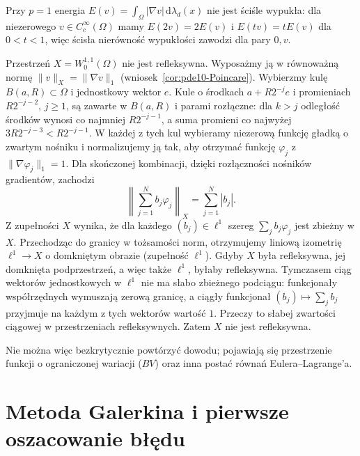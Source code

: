 \begin{uwaga}[Dlaczego pominięto przypadek $p=1$?]
Przy $p=1$ energia
$E(v)=\int_\Omega|\nabla v|\,\mathrm d\lambda_d(x)$
nie jest ściśle wypukła: dla niezerowego
$v\in C_c^\infty(\Omega)$ mamy $E(2v)=2E(v)$
i $E(tv)=tE(v)$ dla $0<t<1$, więc ścisła
nierówność wypukłości zawodzi dla pary $0,v$.

Przestrzeń $X=W_0^{1,1}(\Omega)$ nie jest refleksywna.
Wyposażmy ją w równoważną normę
$\|v\|_X=\|\nabla v\|_1$ (wniosek~\ref{cor:pde10-Poincare}).
Wybierzmy kulę $B(a,R)\subset\Omega$ i jednostkowy
wektor $e$. Kule o środkach $a+R2^{-j}e$
i promieniach $R2^{-j-2}$, $j\ge1$,
są zawarte w $B(a,R)$ i parami rozłączne:
dla $k>j$ odległość środków wynosi co najmniej
$R2^{-j-1}$, a suma promieni co najwyżej
$3R2^{-j-3}<R2^{-j-1}$.
W każdej z tych kul wybieramy niezerową funkcję
gładką o zwartym nośniku i normalizujemy ją tak,
aby otrzymać funkcję $\varphi_j$ z
$\|\nabla\varphi_j\|_1=1$.
Dla skończonej kombinacji, dzięki rozłączności
nośników gradientów, zachodzi
\[
 \left\|\sum_{j=1}^N b_j\varphi_j\right\|_X
 =\sum_{j=1}^N|b_j|.
\]
Z zupełności $X$ wynika, że dla każdego
$(b_j)\in\ell^1$ szereg $\sum_j b_j\varphi_j$
jest zbieżny w $X$. Przechodząc do granicy
w tożsamości norm, otrzymujemy liniową izometrię
$\ell^1\to X$ o domkniętym obrazie (zupełność $\ell^1$).
Gdyby $X$ była refleksywna, jej domknięta
podprzestrzeń, a więc także $\ell^1$, byłaby
refleksywna. Tymczasem ciąg wektorów jednostkowych
w $\ell^1$ nie ma słabo zbieżnego podciągu:
funkcjonały współrzędnych wymuszają zerową granicę,
a ciągły funkcjonał $(b_j)\mapsto\sum_j b_j$
przyjmuje na każdym z tych wektorów wartość $1$.
Przeczy to słabej zwartości ciągowej w przestrzeniach
refleksywnych. Zatem $X$ nie jest refleksywna.

Nie można więc bezkrytycznie powtórzyć dowodu;
pojawiają się przestrzenie funkcji o ograniczonej
wariacji ($BV$) oraz inna postać równań Eulera--Lagrange'a.
\end{uwaga}

\section{Metoda Galerkina i pierwsze oszacowanie błędu}
\label{sec:pde11-galerkin}

